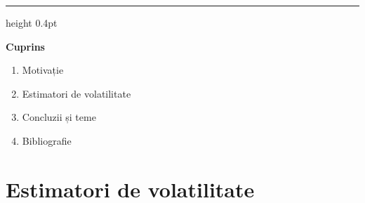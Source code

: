 \documentclass[9pt, aspectratio=169, t]{beamer}
\theoremstyle{definition}
\begin{document}
{
\begin{frame}{}
    {\color{FooterGray}\hrule height 0.4pt}

    \vspace{0.3cm}

    {\Large\textcolor{IDAred}{\textbf{Cuprins}}}

    \vspace{0.4cm}

    \begin{enumerate}
        \item Motivație \checkmark
        \item Estimatori de volatilitate
        \item Concluzii și teme
        \item Bibliografie
    \end{enumerate}
\end{frame}
}

\section{Estimatori de volatilitate}
\end{document}
